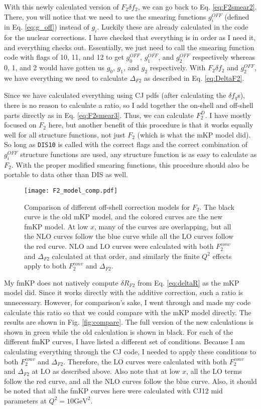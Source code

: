 \documentclass[12pt]{article}
\begin{document}
With this newly calculated version of $F_2\delta f_2$, we can go back to Eq. \ref{eq:F2smear2}.  There, you will notice that we need to use the smearing functions $g_i^{OFF}$ (defined in Eq. \ref{eq:g_off}) instead of $g_i$.  Luckily these are already calculated in the code for the nuclear corrections.  I have checked that everything is in order as I need it, and everything checks out.  Essentially, we just need to call the smearing function code with flags of 10, 11, and 12 to get $g_0^{OFF}$, $g_1^{OFF}$, and $g_2^{OFF}$ respectively whereas 0, 1, and 2 would have gotten us $g_0$, $g_1$, and $g_2$ respectively.  With $F_2\delta f_2$ and $g_2^{OFF}$, we have everything we need to calculate $\Delta_{F2}$ as described in Eq. \ref{eq:DeltaF2}.

Since we have calculated everything using CJ pdfs (after calculating the $\delta f_q$s), there is no reason to calculate a ratio, so I add together the on-shell and off-shell parts directly as in Eq. \ref{eq:F2smear3}.  Thus, we can calculate $F_2^D$.  I have mostly focused on $F_2$ here, but another benefit of this procedure is that it works equally well for all structure functions, not just $F_2$ (which is what the mKP model did).  So long as \verb+DIS10+ is called with the correct flags and the correct combination of $g_i^{OFF}$ structure functions are used, any structure function is as easy to calculate as $F_2$.  With the proper modified smearing functions, this procedure should also be portable to data other than DIS as well.

\begin{figure}[t]
\centering
\texttt{[image: F2\_model\_comp.pdf]}
\caption{Comparison of different off-shell correction models for $F_2$.  The black curve is the old mKP model, and the colored curves are the new fmKP model.  At low $x$, many of the curves are overlapping, but all the NLO curves follow the blue curve while all the LO curves follow the red curve.  NLO and LO curves were calculated with both $F_2^{conv}$ and $\Delta_{F2}$ calculated at that order, and similarly the finite $Q^2$ effects apply to both $F_2^{conv}$ and $\Delta_{F2}$.}
\label{fig:f_g}
\end{figure}

My fmKP does not natively compute $\delta R_{F2}$ from Eq. \ref{eq:deltaR} as the mKP model did.  Since it works directly with the additive correction, such a ratio is unnecessary.  However, for comparison's sake, I went through and made my code calculate this ratio so that we could compare with the mKP model directly.  The results are shown in Fig. \ref{fig:compare}.  The full version of the new calculations is shown in green while the old calculation is shown in black.  For each of the different fmKP curves, I have listed a different set of conditions.  Because I am calculating everything through the CJ code, I needed to apply these conditions to both $F_2^{conv}$ and $\Delta_{F2}$.  Therefore, the LO curves were calculated with both $F_2^{conv}$ and $\Delta_{F2}$ at LO as described above.  Also note that at low $x$, all the LO terms follow the red curve, and all the NLO curves follow the blue curve.  Also, it should be noted that all the fmKP curves here were calculated with CJ12 mid parameters at $Q^2=10 \text{GeV}^2$.
\end{document}
